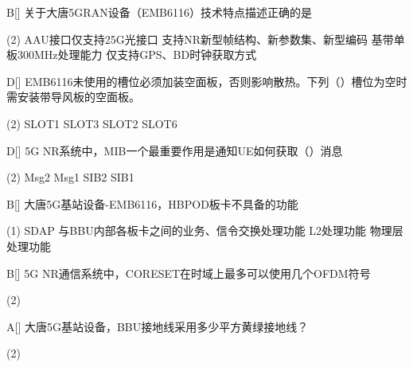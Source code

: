 \begin{choice}{B}[]
    关于大唐5GRAN设备（EMB6116）技术特点描述正确的是
    \begin{tasks}(2)
        \task AAU接口仅支持25G光接口
        \task 支持NR新型帧结构、新参数集、新型编码
        \task 基带单板300MHz处理能力
        \task 仅支持GPS、BD时钟获取方式
    \end{tasks}
\end{choice}

\begin{choice}{D}[]
    EMB6116未使用的槽位必须加装空面板，否则影响散热。下列（\quad）槽位为空时需安装带导风板的空面板。
    \begin{tasks}(2)
        \task SLOT1
        \task SLOT3
        \task SLOT2
        \task SLOT6
    \end{tasks}
\end{choice}


\begin{choice}{D}[]
    5G NR系统中，MIB一个最重要作用是通知UE如何获取（\quad）消息
    \begin{tasks}(2)
        \task Msg2
        \task Msg1
        \task SIB2
        \task SIB1
    \end{tasks}
\end{choice}


\begin{choice}{B}[]
    大唐5G基站设备-EMB6116，HBPOD板卡不具备的功能
    \begin{tasks}(1)
        \task SDAP
        \task 与BBU内部各板卡之间的业务、信令交换处理功能
        \task L2处理功能
        \task 物理层处理功能
    \end{tasks}
\end{choice}


\begin{choice}{B}[]
    5G NR通信系统中，CORESET在时域上最多可以使用几个OFDM符号
    \begin{tasks}(2)
    \end{tasks}
\end{choice}



\begin{choice}{A}[]
    大唐5G基站设备，BBU接地线采用多少平方黄绿接地线？
    \begin{tasks}(2)
    \end{tasks}
\end{choice}

